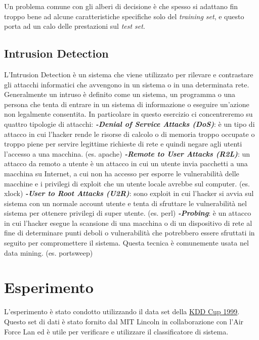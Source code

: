 \documentclass[a4paper,12pt]{article}
\begin{document}
Un problema comune con gli alberi di decisione è che spesso si adattano fin troppo bene ad alcune
	caratteristiche specifiche solo del \textit{training set}, e questo porta ad un calo delle
	prestazioni sul \textit{test set}.  

\subsection{Intrusion Detection}
L'Intrusion Detection è un sistema che viene utilizzato per rilevare e contrastare gli attacchi
	informatici che avvengono in un sistema o in una determinata rete. Generalmente un intruso è
	definito come un sistema, un programma o una persona che tenta di entrare in un sistema di
	informazione o eseguire un'azione non legalmente consentita. 
\newline
In particolare in questo esercizio ci concentreremo su quattro tipologie di attacchi:
\newline \textit{\textbf{-Denial of Service Attacks (DoS)}}: è un tipo di attacco in cui l'hacker rende le risorse di calcolo o di memoria troppo occupate o troppo piene per servire legittime richieste di rete e quindi negare agli utenti l'accesso a una macchina. (es. apache)
\newline \textit{\textbf{-Remote to User Attacks (R2L)}}: un attacco da remoto a utente è un attacco in cui un utente invia pacchetti a una macchina su Internet, a cui non ha accesso per esporre le vulnerabilità delle macchine e i privilegi di exploit che un utente locale avrebbe sul computer. (es. xlock)
\newline \textit{\textbf{-User to Root Attacks (U2R)}}: sono exploit in cui l'hacker si avvia sul sistema con un normale account utente e tenta di sfruttare le vulnerabilità nel sistema per ottenere privilegi di super utente.  (es. perl)
\newline \textit{\textbf{-Probing}}: è un attacco in cui l'hacker esegue la scansione di una macchina o di un dispositivo di rete al fine di determinare punti deboli o vulnerabilità che potrebbero essere sfruttati in seguito per compromettere il sistema. Questa tecnica è comunemente usata nel data mining. (es. portsweep)

\section{Esperimento}
L'esperimento è stato condotto utilizzando il data set della \href{http://kdd.ics.uci.edu/databases/kddcup99/kddcup99.html}{KDD Cup 1999}.
	 Questo set di dati è stato fornito dal MIT Lincoln in collaborazione con l'Air Force Lan ed
	 è utile per verificare e utilizzare il classificatore di sistema.
\newline
\end{document}
